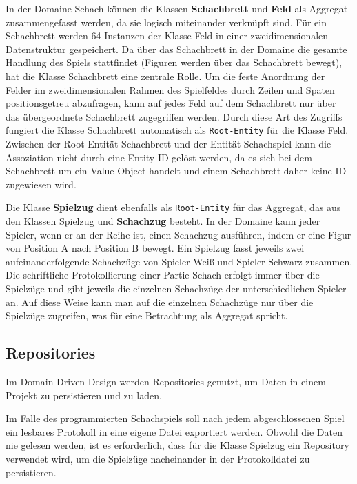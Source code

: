 In der Domaine \glqq Schach\grqq{} können die Klassen \textbf{Schachbrett} und \textbf{Feld} als Aggregat zusammengefasst werden, da sie logisch miteinander verknüpft sind. 
Für ein Schachbrett werden 64 Instanzen der Klasse Feld in einer zweidimensionalen Datenstruktur gespeichert. 
Da über das Schachbrett in der Domaine die gesamte Handlung des Spiels stattfindet (Figuren werden über das Schachbrett bewegt), hat die Klasse Schachbrett eine zentrale Rolle.
Um die feste Anordnung der Felder im zweidimensionalen Rahmen des Spielfeldes durch Zeilen und Spaten positionsgetreu abzufragen, kann auf jedes Feld auf dem Schachbrett nur über das übergeordnete Schachbrett zugegriffen werden. 
Durch diese Art des Zugriffs fungiert die Klasse Schachbrett automatisch als \texttt{Root-Entity} für die Klasse Feld.
Zwischen der Root-Entität Schachbrett und der Entität Schachspiel kann die Assoziation nicht durch eine Entity-ID gelöst werden, da es sich bei dem Schachbrett um ein Value Object handelt und einem Schachbrett daher keine ID zugewiesen wird. 

Die Klasse \textbf{Spielzug} dient ebenfalls als \texttt{Root-Entity} für das Aggregat, das aus den Klassen  Spielzug und \textbf{Schachzug} besteht. 
In der Domaine kann jeder Spieler, wenn er an der Reihe ist, einen Schachzug ausführen, indem er eine Figur von Position A nach Position B bewegt. 
Ein Spielzug fasst jeweils zwei aufeinanderfolgende Schachzüge von Spieler \glqq Weiß\grqq{} und Spieler \glqq Schwarz\grqq{} zusammen. 
Die schriftliche Protokollierung einer Partie Schach erfolgt immer über die Spielzüge und gibt jeweils die einzelnen Schachzüge der unterschiedlichen Spieler an. 
Auf diese Weise kann man auf die einzelnen Schachzüge nur über die Spielzüge zugreifen, was für eine Betrachtung als Aggregat spricht.  

\subsection*{Repositories}

Im Domain Driven Design werden Repositories genutzt, um Daten in einem Projekt zu persistieren und zu laden. 

Im Falle des programmierten Schachspiels soll nach jedem abgeschlossenen Spiel ein lesbares Protokoll in eine eigene Datei exportiert werden.
Obwohl die Daten nie gelesen werden, ist es erforderlich, dass für die Klasse Spielzug ein Repository verwendet wird, um die Spielzüge nacheinander in der Protokolldatei zu persistieren. 

